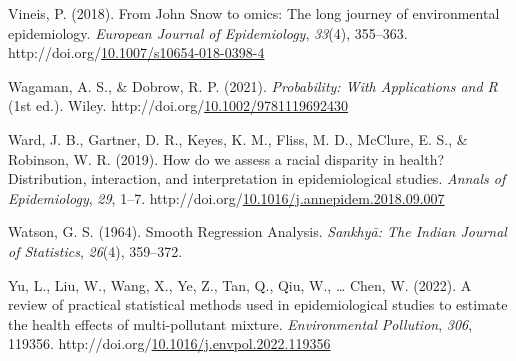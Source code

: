 \documentclass[12pt, twoside]{amherstthesis}
\newenvironment{CSLReferences}[2]%
  {}%
  {\par}
\begin{document}
\begin{CSLReferences}{1}{0}
\leavevmode{}%
Vineis, P. (2018). From {John} {Snow} to omics: The long journey of environmental epidemiology. \emph{European Journal of Epidemiology}, \emph{33}(4), 355--363. http://doi.org/\href{https://doi.org/10.1007/s10654-018-0398-4}{10.1007/s10654-018-0398-4}

\leavevmode{}%
Wagaman, A. S., \& Dobrow, R. P. (2021). \emph{Probability: {With} {Applications} and {R}} (1st ed.). Wiley. http://doi.org/\href{https://doi.org/10.1002/9781119692430}{10.1002/9781119692430}

\leavevmode{}%
Ward, J. B., Gartner, D. R., Keyes, K. M., Fliss, M. D., McClure, E. S., \& Robinson, W. R. (2019). How do we assess a racial disparity in health? {Distribution}, interaction, and interpretation in epidemiological studies. \emph{Annals of Epidemiology}, \emph{29}, 1--7. http://doi.org/\href{https://doi.org/10.1016/j.annepidem.2018.09.007}{10.1016/j.annepidem.2018.09.007}

\leavevmode{}%
Watson, G. S. (1964). Smooth {Regression} {Analysis}. \emph{Sankhyā: The Indian Journal of Statistics}, \emph{26}(4), 359--372.

\leavevmode{}%
Yu, L., Liu, W., Wang, X., Ye, Z., Tan, Q., Qiu, W., \ldots{} Chen, W. (2022). A review of practical statistical methods used in epidemiological studies to estimate the health effects of multi-pollutant mixture. \emph{Environmental Pollution}, \emph{306}, 119356. http://doi.org/\href{https://doi.org/10.1016/j.envpol.2022.119356}{10.1016/j.envpol.2022.119356}

\end{CSLReferences}
\end{document}
